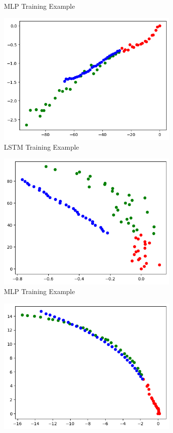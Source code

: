 \documentclass{article}
\begin{document}
\begin{itemize}
\begin{figure}[h]
    \caption{MLP Training Example}
  \end{figure}
  \begin{figure}[h]
    \centering
    \includegraphics[width=0.8\textwidth]{lstm_2.png}
    \caption{LSTM Training Example}
  \end{figure}
  \begin{figure}[h]
    \centering
    \includegraphics[width=0.8\textwidth]{mlp_3.png}
    \caption{MLP Training Example}
  \end{figure}
  \begin{figure}[h]
    \centering
    \includegraphics[width=0.8\textwidth]{lstm_3.png}

\end{figure}
\end{itemize}
\end{document}

